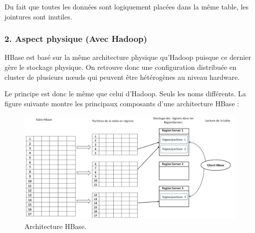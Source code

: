 Du fait que toutes les données sont logiquement placées dans la même table, les jointures sont inutiles.

\newpage

\subsubsection*{2. Aspect physique (Avec Hadoop)}
HBase est basé sur la même architecture physique qu'Hadoop puisque ce dernier gère le stockage physique. On retrouve donc une configuration distribuée en cluster de plusieurs nœuds qui peuvent être hétérogènes au niveau hardware.

Le principe est donc le même que celui d'Hadoop. Seuls les noms différents. La figure suivante montre les principaux composants d'une architecture HBase :

\begin{figure}[h]
	\centering
    \includegraphics[scale=0.5]{img/part2/2.3}
    \caption{Architecture HBase.}
\end{figure}

